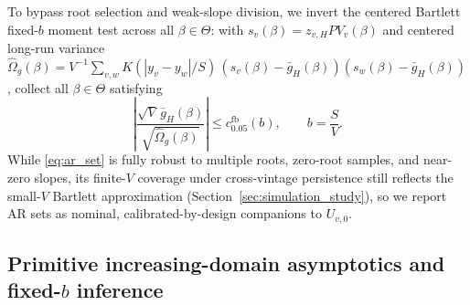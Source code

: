 \documentclass[12pt]{article}
\begin{document}
To bypass root selection and weak-slope division, we invert the centered Bartlett fixed-$b$ moment test \citep{AR49,SW00,KV05} across all $\beta \in \Theta$: with $s_v(\beta) = z_{v,H} PV_v(\beta)$ and centered long-run variance $\hat\Omega_g(\beta) = V^{-1}\sum_{v,w} K(|y_v - y_w|/S)\,(s_v(\beta)-\bar{g}_H(\beta))(s_w(\beta)-\bar{g}_H(\beta))$, collect all $\beta \in \Theta$ satisfying
\begin{equation}
\label{eq:ar_set}
\left|\frac{\sqrt{V}\,\bar{g}_H(\beta)}{\sqrt{\hat\Omega_g(\beta)}}\right| \le c_{0.05}^{\mathrm{fb}}(b),
\qquad
b = \frac{S}{V}.
\end{equation}
While \eqref{eq:ar_set} is fully robust to multiple roots, zero-root samples, and near-zero slopes, its finite-$V$ coverage under cross-vintage persistence still reflects the small-$V$ Bartlett approximation (Section~\ref{sec:simulation_study}), so we report AR sets as nominal, calibrated-by-design companions to $U_{v,0}$.

\subsection{Primitive increasing-domain asymptotics and fixed-$b$ inference}
\label{sec:asymptotic_framework}
\end{document}
